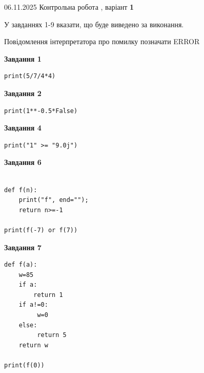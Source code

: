 \documentclass[12pt, ukrainian]{article}
\begin{document}
{\Large{06.11.2025 Контрольна робота , варіант  \No \textbf { 1 }\par}}
{
\begin {large}
У завданнях 1-9 вказати, що буде виведено за виконання.

Повідомлення інтерпретатора про помилку позначати ERROR

\begin{minipage}[t]{7.5cm}

\begin{center}
\textbf{Завдання 1}
\end{center}

\begin{verbatim}
print(5/7/4*4)
\end{verbatim}



\begin{center}
\textbf{Завдання 2}
\end{center}

\begin{verbatim}
print(1**-0.5*False)
\end{verbatim}



\begin{center}
\textbf{Завдання 4}
\end{center}

\begin{verbatim}
print("1" >= "9.0j")
\end{verbatim}



\begin{center}
\textbf{Завдання 6}
\end{center}

\begin{verbatim}

def f(n):
    print("f", end="");
    return n>=-1

print(f(-7) or f(7))
\end{verbatim}



\begin{center}
\textbf{Завдання 7}
\end{center}

\begin{verbatim}
def f(a):
    w=85
    if a: 
        return 1
    if a!=0:
         w=0
    else:
         return 5
    return w

print(f(0))
\end{verbatim}


\end{minipage}
\end{large}}
\end{document}
